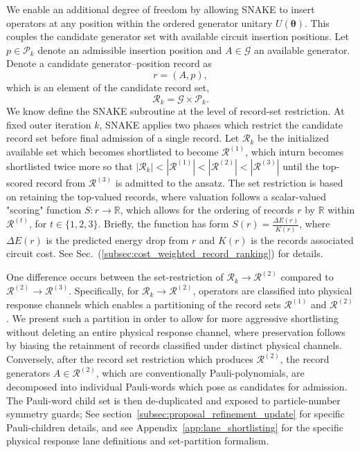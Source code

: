 \documentclass[
  reprint,
  amsmath,
  amssymb,
  aps,
  pra,
  nofootinbib,
  superscriptaddress,
  floatfix
]{revtex4-2}
\newcommand{\Pcal}{\mathcal{P}}
\begin{document}
We enable an additional degree of freedom by allowing SNAKE to insert operators at any position within the ordered generator unitary $U(\boldsymbol{\theta})$. This couples the candidate generator set with available circuit insertion positions. Let \(p\in\mathcal P_k\) denote an admissible insertion position and \(A\in\mathcal G\) an available generator. Denote a candidate generator--position record as
\[
r=(A,p),
\]
which is an element of the candidate record set,
\begin{equation}
\mathcal R_k=\mathcal G\times\Pcal_k .
\label{record_set}
\end{equation}
We know define the SNAKE subroutine at the level of record-set restriction. 
At fixed outer iteration \(k\), SNAKE applies two phases which restrict the candidate record set before final admission of a single record. Let $\mathcal R_k$ be the initialized available set which becomes shortlisted to become $\mathcal R^{(1)}$, which inturn becomes shortlisted twice more so that $|\mathcal{R}_k|<|\mathcal{R}^{(1)}|<|\mathcal{R}^{(2)}|<|\mathcal{R}^{(3)}|$ until the top-scored record from $\mathcal{R}^{(3)}$ is admitted to the ansatz. The set restriction is based on retaining the top-valued records, where valuation follows a scalar-valued "scoring" function  $S: r\to \mathbb R$, which allows for the ordering of records $r$ by $\mathbb R$ within $\mathcal{R}^{(t)}$, for $t\in\{1,2,3\}$. Briefly, the function has form $S(r)=\frac{\Delta E(r)}{K(r)}$, where $\Delta E(r)$ is the predicted energy drop from $r$ and $K(r)$ is the records associated circuit cost. See Sec.~(\ref{subsec:cost_weighted_record_ranking}) for details. 

One difference occurs between the set-restriction of $\mathcal{R}_k \to \mathcal R^{(2)}$ compared to $\mathcal{R}^{(2)}\to \mathcal{R}^{(3)}$. Specifically, for $\mathcal{R}_k \to \mathcal R^{(2)}$, operators are classified into physical response channels which enables a partitioning of the record sets $\mathcal{R}^{(1)}$ and $ \mathcal R^{(2)}$. We present such a partition in order to allow for more aggressive shortlisting without deleting an entire physical response channel, where preservation follows by biasing the retainment of records classified under distinct physical channels. Conversely, after the record set restriction which produces $\mathcal R^{(2)}$, the record generators $A\in\mathcal R^{(2)}$, which are conventionally Pauli-polynomials, are decomposed into individual Pauli-words which pose as candidates for admission. The Pauli-word child set is then de-duplicated and exposed to particle-number symmetry guards; See section~\ref{subsec:proposal_refinement_update} for specific Pauli-children details, and see Appendix~\ref{app:lane_shortlisting} for the specific physical response lane definitions and set-partition formalism. 
\end{document}
